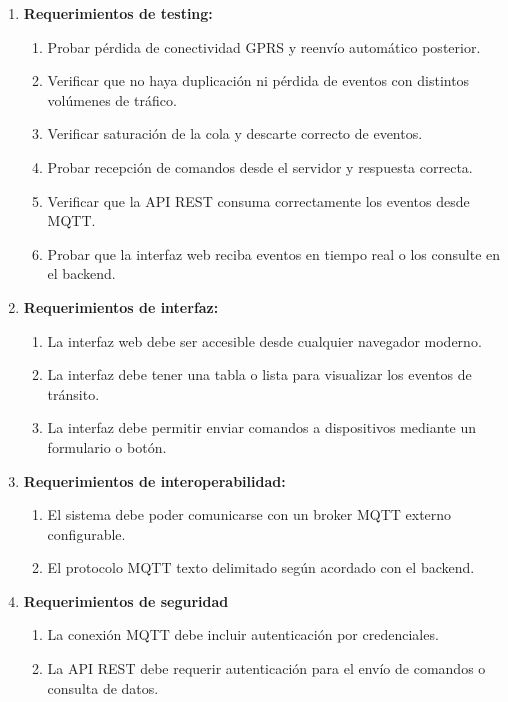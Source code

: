 \documentclass[
11pt, %
]{charter}
\begin{document}
\begin{enumerate}
	\item \textbf{Requerimientos de testing:}
		\begin{enumerate}
			\item Probar pérdida de conectividad GPRS y reenvío automático posterior.
			\item Verificar que no haya duplicación ni pérdida de eventos con distintos volúmenes de tráfico.
			\item  Verificar saturación de la cola y descarte correcto de eventos.
			\item  Probar recepción de comandos desde el servidor y respuesta correcta.
			\item  Verificar que la API REST consuma correctamente los eventos desde MQTT.
			\item  Probar que la interfaz web reciba eventos en tiempo real o los consulte en el backend.
		\end{enumerate}
	\item \textbf{Requerimientos de interfaz:}
		\begin{enumerate}
			\item La interfaz web debe ser accesible desde cualquier navegador moderno.
			\item La interfaz debe tener una tabla o lista para visualizar los eventos de tránsito.
			\item La interfaz debe permitir enviar comandos a dispositivos mediante un formulario o botón.
		\end{enumerate}

	
	\item \textbf{Requerimientos de interoperabilidad:}
		\begin{enumerate}
			\item  El sistema debe poder comunicarse con un broker MQTT externo configurable.
			\item  El protocolo MQTT texto delimitado según acordado con el backend.
		\end{enumerate}

	\item \textbf{Requerimientos de seguridad}
		\begin{enumerate}
			\item La conexión MQTT debe incluir autenticación por credenciales.
			\item La API REST debe requerir autenticación para el envío de comandos o consulta de datos.
	 	\end{enumerate}
\end{enumerate}
\end{document}
